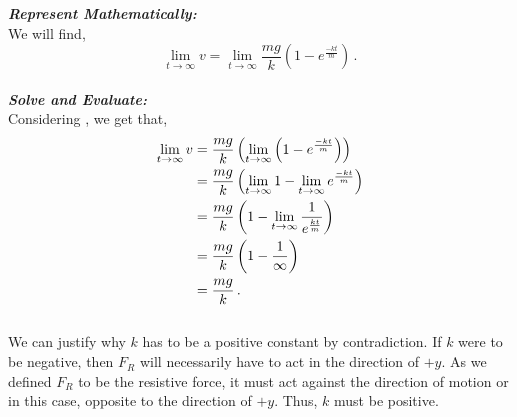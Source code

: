 \begin{subquestions}
\begin{subsubquestions}
\textbf{\textit{Represent Mathematically:}} \\ 
We will find,
\begin{equation}
	\lim_{t\rightarrow \infty} v = \lim_{t\rightarrow \infty}      \frac{mg}{k}\left(1-e^{\frac{-kt}{m}}\right) \label{2005:q5:TLim} \,.
\end{equation}\\




\textbf{\textit{Solve and Evaluate:}} \\ 
Considering , we get that,
\begin{align}
		\lim_{t\rightarrow \infty} v & = \frac{mg}{k} \left(\lim_{t\rightarrow \infty}      \left(1-e^{\frac{-kt}{m}}\right)\right) \nonumber \\
		 & = \frac{mg}{k} \left(\lim_{t\rightarrow \infty}1-\lim_{t\rightarrow \infty}e^{\frac{-kt}{m}}\right) \nonumber \\
	 	 & = \frac{mg}{k} \left(1-\lim_{t\rightarrow \infty}\frac{1}{e^{\frac{kt}{m}}}\right) \nonumber \\ 
		 & = \frac{mg}{k} \left(1-\frac{1}{\infty}\right) \nonumber \\ 
		 & = \frac{mg}{k} \,.
\end{align}\\

We can justify why $k$ has to be a positive constant by contradiction. If $k$ were to be negative, then $F_R$ will necessarily have to act in the direction of $+y$. As we defined $F_R$ to be the resistive force, it must act against the direction of motion or in this case, opposite to the direction of $+y$. Thus, $k$ must be positive.

\end{subsubquestions}
	
\end{subquestions}





















